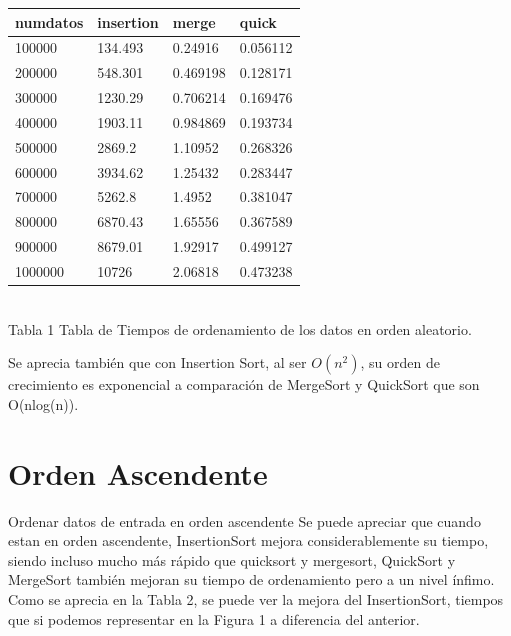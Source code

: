 \documentclass{article}
\begin{document}
\begin{center}
\begin{tabular}{|l|l|l|l|}
\hline
numdatos & insertion & merge & quick\\
\hline
100000 & 134.493 & 0.24916 & 0.056112\\
200000 & 548.301 & 0.469198 & 0.128171\\
300000 & 1230.29 & 0.706214 & 0.169476\\
400000 & 1903.11 & 0.984869 & 0.193734\\
500000 & 2869.2 & 1.10952 & 0.268326\\
600000 & 3934.62 & 1.25432 & 0.283447\\
700000 & 5262.8 & 1.4952 & 0.381047\\
800000 & 6870.43 & 1.65556 & 0.367589\\
900000 & 8679.01 & 1.92917 & 0.499127\\
1000000 & 10726 & 2.06818 & 0.473238\\
\hline
\end{tabular}\\

Tabla 1 Tabla de Tiempos de ordenamiento de los datos en orden aleatorio.
\end{center}

Se aprecia también que con Insertion Sort, al ser $O(n^2)$, su orden de crecimiento es exponencial a comparación de MergeSort y QuickSort que son O(nlog(n)).

\newpage

\section{Orden Ascendente}
Ordenar datos de entrada en orden ascendente
Se puede apreciar que cuando estan en orden ascendente, InsertionSort mejora considerablemente su tiempo, siendo incluso mucho más rápido que quicksort y mergesort, QuickSort y MergeSort también mejoran su tiempo de ordenamiento pero a un nivel ínfimo.\\

Como se aprecia en la Tabla 2, se puede ver la mejora del InsertionSort, tiempos que si podemos representar en la Figura 1 a diferencia del anterior.\\
\end{document}

